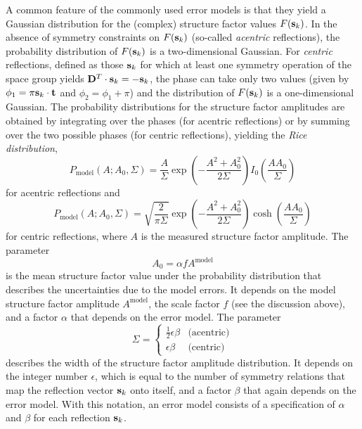\documentclass[11pt]{article}
\newcommand{\vect}[1]{{\bf #1}}
\newcommand{\mat}[1]{{\bf #1}}
\newcommand{\vs}{\vect{s}}
\newcommand{\vt}{\vect{t}}
\begin{document}
\begin{sloppy}
A common feature of the commonly used error models is that they yield
a Gaussian distribution for the (complex) structure factor values
$F(\vs_k)$. In the absence of symmetry constraints on $F(\vs_k)$
(so-called \textit{acentric} reflections), the probability
distribution of $F(\vs_k)$ is a two-dimensional Gaussian. For
\textit{centric} reflections, defined as those $\vs_k$ for which at
least one symmetry operation of the space group yields
$\mat{D}^T\cdot\vs_k = -\vs_k$, the phase can take only two values
(given by $\phi_1 = \pi \vs_k\cdot\vt$ and $\phi_2 = \phi_1+\pi$) and
the distribution of $F(\vs_k)$ is a one-dimensional Gaussian. The
probability distributions for the structure factor amplitudes are
obtained by integrating over the phases (for acentric reflections) or
by summing over the two possible phases (for centric reflections),
yielding the \textit{Rice distribution},
\begin{equation}
P_{\mbox{model}}(A; A_0, \Sigma) = \frac{A}{\Sigma}
                      \exp\left(-\frac{A^2+A_0^2}{2\Sigma}\right)
                      I_0\left(\frac{A A_0}{\Sigma}\right)
\end{equation}
for acentric reflections and
\begin{equation}
P_{\mbox{model}}(A; A_0, \Sigma) = \sqrt{\frac{2}{\pi\Sigma}}
                      \exp\left(-\frac{A^2+A_0^2}{2\Sigma}\right)
                      \cosh\left(\frac{A A_0}{\Sigma}\right)
\end{equation}
for centric reflections, where $A$ is the measured structure factor
amplitude. The parameter
\begin{equation}
A_0 = \alpha f A^{\mbox{model}}
\end{equation}
is the mean structure factor value under the probability distribution
that describes the uncertainties due to the model errors. It depends
on the model structure factor amplitude $A^{\mbox{model}}$, the scale factor
$f$ (see the discussion above), and a factor $\alpha$ that depends on
the error model. The parameter
\begin{equation}
\Sigma = \left\{
  \begin{array}{cl}
    \frac{1}{2} \epsilon \beta & \mbox{(acentric)} \\
    \epsilon \beta &\mbox{(centric)}
  \end{array}
\right. 
\end{equation}
describes the width of the structure factor amplitude distribution. It
depends on the integer number $\epsilon$, which is equal to the number
of symmetry relations that map the reflection vector $\vs_k$ onto
itself, and a factor $\beta$ that again depends on the error model.
With this notation, an error model consists of a specification of
$\alpha$ and $\beta$ for each reflection $\vs_k$.


\end{sloppy}
\end{document}
